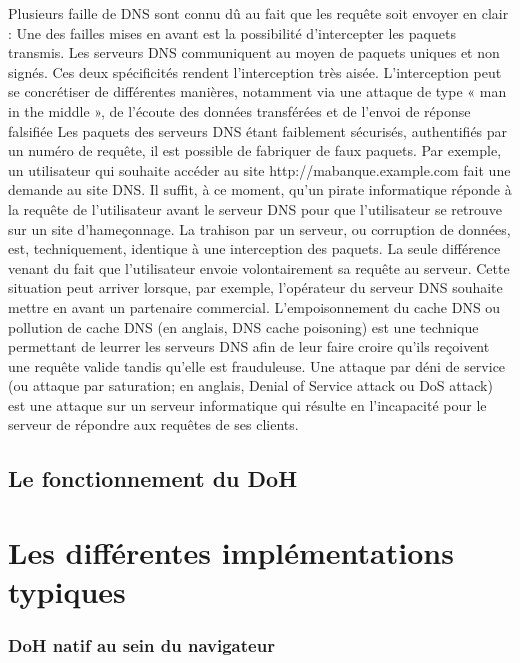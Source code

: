 \documentclass[a4paper,12pt]{article}
\begin{document}
	Plusieurs faille de DNS sont connu dû au fait que les requête soit envoyer en clair : 
	Une des failles mises en avant est la possibilité d'intercepter les paquets transmis. Les serveurs DNS communiquent au moyen de paquets uniques et non signés. Ces deux spécificités rendent l'interception très aisée. L'interception peut se concrétiser de différentes manières, notamment via une attaque de type « man in the middle », de l'écoute des données transférées et de l'envoi de réponse falsifiée
	Les paquets des serveurs DNS étant faiblement sécurisés, authentifiés par un numéro de requête, il est possible de fabriquer de faux paquets. Par exemple, un utilisateur qui souhaite accéder au site http://mabanque.example.com fait une demande au site DNS. Il suffit, à ce moment, qu'un pirate informatique réponde à la requête de l'utilisateur avant le serveur DNS pour que l'utilisateur se retrouve sur un site d'hameçonnage.
	La trahison par un serveur, ou corruption de données, est, techniquement, identique à une interception des paquets. La seule différence venant du fait que l'utilisateur envoie volontairement sa requête au serveur. Cette situation peut arriver lorsque, par exemple, l'opérateur du serveur DNS souhaite mettre en avant un partenaire commercial.
	L'empoisonnement du cache DNS ou pollution de cache DNS (en anglais, DNS cache poisoning) est une technique permettant de leurrer les serveurs DNS afin de leur faire croire qu'ils reçoivent une requête valide tandis qu'elle est frauduleuse.
	Une attaque par déni de service (ou attaque par saturation; en anglais, Denial of Service attack ou DoS attack) est une attaque sur un serveur informatique qui résulte en l'incapacité pour le serveur de répondre aux requêtes de ses clients.
	
	\subsection{Le fonctionnement du DoH}
	
	\section{Les différentes implémentations typiques}
	
	\subsubsection{DoH natif au sein du navigateur}
	
\end{document}
